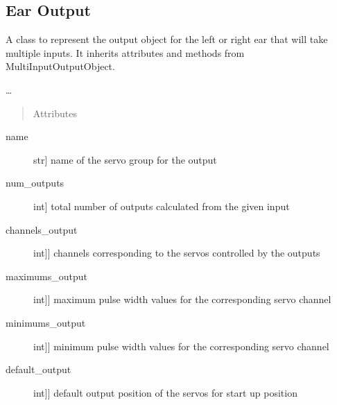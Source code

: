 \documentclass[letterpaper,10pt,english]{sphinxmanual}
\begin{document}
\subsection{Ear Output}
\label{\detokenize{specific:module-EarOutput}}\label{\detokenize{specific:ear-output}}

\begin{fulllineitems}
\label{\detokenize{specific:EarOutput.EarOutput}}
\sphinxAtStartPar
A class to represent the output object for the left or right ear that will take multiple inputs.
It inherits attributes and methods from MultiInputOutputObject.

\sphinxAtStartPar
…
\begin{quote}\begin{description}
\item[{Attributes}] \leavevmode
\end{description}\end{quote}
\begin{description}
\item[{name}] \leavevmode{[}str{]}
\sphinxAtStartPar
name of the servo group for the output

\item[{num\_outputs}] \leavevmode{[}int{]}
\sphinxAtStartPar
total number of outputs calculated from the given input

\item[{channels\_output}] \leavevmode{[}{[}int{]}{]}
\sphinxAtStartPar
channels corresponding to the servos controlled by the outputs

\item[{maximums\_output}] \leavevmode{[}{[}int{]}{]}
\sphinxAtStartPar
maximum pulse width values for the corresponding servo channel

\item[{minimums\_output}] \leavevmode{[}{[}int{]}{]}
\sphinxAtStartPar
minimum pulse width values for the corresponding servo channel

\item[{default\_output}] \leavevmode{[}{[}int{]}{]}
\sphinxAtStartPar
default output position of the servos for start up position


\end{description}
\end{fulllineitems}
\end{document}

